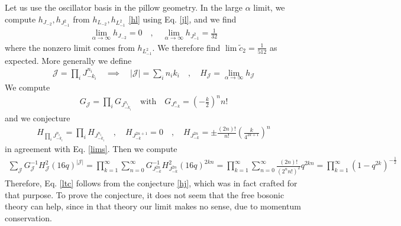 \documentclass[12pt,a4paper]{article}
\begin{document}
Let us use the oscillator basis in the pillow geometry. In the large $\alpha$ limit, we compute $h_{J_{-2}},h_{J_{-1}^2}$ from $h_{L_{-2}},h_{L_{-1}^2}$ \eqref{hl} using Eq. \eqref{jl}, and we find 
\begin{align}
 \lim_{\alpha\to \infty} h_{J_{-2}} = 0 \quad , \quad \lim_{\alpha\to \infty} h_{J_{-1}^2} = \frac{1}{32}
 \label{lims}
\end{align}
where the nonzero limit comes from $h_{L_{-1}^2}$. We therefore find $\lim \tilde{c}_2 = \frac{1}{512}$ as expected. 
More generally we define 
\begin{align}
 \mathcal{J} = \prod_i J_{-k_i}^{n_i}  \quad \implies \quad |\mathcal{J}| = \sum_i n_ik_i \quad , \quad 
 H_\mathcal{J} = \lim_{\alpha\to \infty} h_\mathcal{J}
\end{align}
We compute 
\begin{align}
 G_\mathcal{J} = \prod_i G_{J_{-k_i}^{n_i}} \quad \text{with} \quad G_{J_{-k}^n} = 
 \left(-\frac{k}{2}\right)^{n} n! 
\end{align}
and we conjecture 
\begin{align}
 H_{\prod_i J_{-k_i}^{n_i}} = \prod_i H_{J_{-k_i}^{n_i}} 
\quad , \quad 
 H_{J_{-k}^{2n+1}} = 0 \quad , \quad H_{J_{-k}^{2n}} = \pm \frac{(2n)!}{n!} \left(\frac{k}{4^{2k+1}}\right)^n 
\label{hj}
 \end{align}
 in agreement with Eq. \eqref{lims}. 
Then we compute 
\begin{align}
 \sum_\mathcal{J} G_\mathcal{J}^{-1} H_\mathcal{J}^2 (16q)^{|\mathcal{J}|} = \prod_{k=1}^\infty \sum_{n=0}^\infty G^{-1}_{J_{-k}^{2n}} H_{J_{-k}^{2n}}^2 (16q)^{2kn} 
 = \prod_{k=1}^\infty \sum_{n=0}^\infty \frac{(2n)!}{(2^nn!)^2} q^{2kn} = \prod_{k=1}^\infty \left(1-q^{2k}\right)^{-\frac12}
\end{align}
Therefore, Eq. \eqref{ltc} follows from the conjecture \eqref{hj}, which was in fact crafted for that purpose. To prove the conjecture, it does not seem that the free bosonic theory can help, since in that theory our limit makes no sense, due to momentum conservation. 




\end{document}
